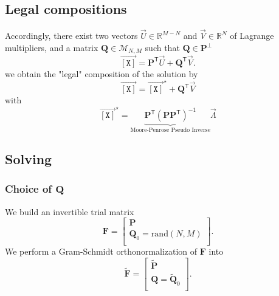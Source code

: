 \documentclass[aps,twocolumn]{revtex4}
\newcommand{\myconc}[1]{\left\lbrack #1 \right\rbrack}
\newcommand{\mychem}[1]{{\mathtt{#1}}}
\newcommand{\mymat}[1]{\boldsymbol{#1}}
\newcommand{\mytrn}[1]{{#1}^{\mathsf{T}}}
\newcommand{\myvec}[1]{\overrightarrow{#1}}
\newcommand{\vecX}{\myvec{\myconc{\mychem{X}}}}
\begin{document}
\subsection{Legal compositions}
Accordingly, there exist two vectors $\vec{U}\in\mathbb{R}^{M-N}$ and $\vec{V}\in \mathbb{R}^{N}$ of Lagrange multipliers, and
a matrix  $\mymat{Q}\in\mathcal{M}_{N,M}$ such that $\mymat{Q}\in\mymat{P}^\perp$
\begin{equation}
	\vecX = \mytrn{\mymat{P}} \vec{U} + \mytrn{\mymat{Q}}\vec{V}.
\end{equation}
we obtain the "legal" composition of the solution by
\begin{equation}
	\vecX = \vecX^\star + \mytrn{\mymat{Q}}\vec{V}
\end{equation}
with 
\begin{equation}
	\vecX^\star= \underbrace{\mytrn{\mymat{P}} \left(\mymat{P} \mytrn{\mymat{P}}\right)^{-1}}_{\text{Moore-Penrose Pseudo Inverse}} \vec{\Lambda}
\end{equation}

\subsection{Solving}
\subsubsection{Choice of $\mymat{Q}$}
We build an invertible trial matrix
\begin{equation}
	\mymat{F} = 
	\left\lbrack
	\begin{array}{c}
		\mymat{P}\\
		\mymat{Q}_0=\text{rand}(N,M)\\
	\end{array}
	\right\rbrack.
\end{equation}
We perform a Gram-Schmidt orthonormalization of $\mymat{F}$ into
\begin{equation}
	\tilde{\mymat{F}} = 
	\left\lbrack
	\begin{array}{c}
		\tilde{\mymat{P}}\\
		\mymat{Q}=\tilde{\mymat{Q}}_0\\
	\end{array}
	\right\rbrack.
\end{equation}
\end{document}
